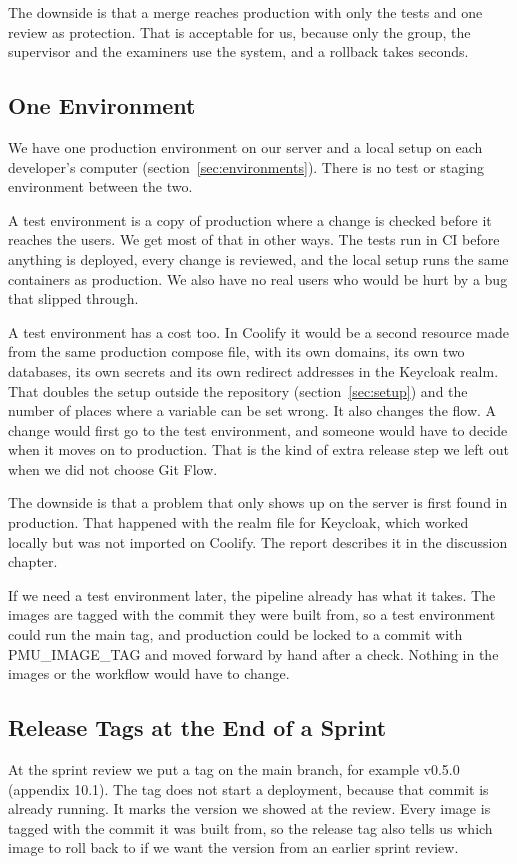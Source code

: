 \documentclass[a4paper,11pt]{article}
\begin{document}
The downside is that a merge reaches production with only the tests and one review as protection. That is acceptable for us, because only the group, the supervisor and the examiners use the system, and a rollback takes seconds.

\subsection{One Environment}
We have one production environment on our server and a local setup on each developer's computer (section~\ref{sec:environments}). There is no test or staging environment between the two.

A test environment is a copy of production where a change is checked before it reaches the users. We get most of that in other ways. The tests run in CI before anything is deployed, every change is reviewed, and the local setup runs the same containers as production. We also have no real users who would be hurt by a bug that slipped through.

A test environment has a cost too. In Coolify it would be a second resource made from the same production compose file, with its own domains, its own two databases, its own secrets and its own redirect addresses in the Keycloak realm. That doubles the setup outside the repository (section~\ref{sec:setup}) and the number of places where a variable can be set wrong. It also changes the flow. A change would first go to the test environment, and someone would have to decide when it moves on to production. That is the kind of extra release step we left out when we did not choose Git Flow.

The downside is that a problem that only shows up on the server is first found in production. That happened with the realm file for Keycloak, which worked locally but was not imported on Coolify. The report describes it in the discussion chapter.

If we need a test environment later, the pipeline already has what it takes. The images are tagged with the commit they were built from, so a test environment could run the main tag, and production could be locked to a commit with PMU\_IMAGE\_TAG and moved forward by hand after a check. Nothing in the images or the workflow would have to change.

\subsection{Release Tags at the End of a Sprint}
At the sprint review we put a tag on the main branch, for example v0.5.0 (appendix 10.1). The tag does not start a deployment, because that commit is already running. It marks the version we showed at the review. Every image is tagged with the commit it was built from, so the release tag also tells us which image to roll back to if we want the version from an earlier sprint review.
\end{document}
